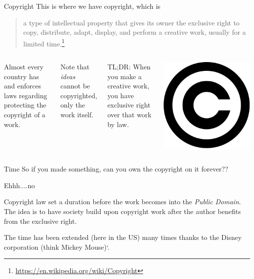 \begin{frame}{Copyright}
  This is where we have copyright, which is
  \begin{quote}
  a type of intellectual property that gives its owner the exclusive right to copy, distribute, adapt, display, and perform a creative work, usually for a limited time.\footnote{\url{https://en.wikipedia.org/wiki/Copyright}}
  \end{quote}
  \begin{columns}[onlytextwidth,T]
  Almost every country has and enforces laws regarding protecting the copyright of a work. \pause

  Note that \textit{ideas} cannot be copyrighted, only the work itself. \pause

  TL;DR: When you make a creative work, you have exclusive right over that work by law.

  \center \includegraphics[width=\textwidth]{eimg/copyrightSym.png}
  \end{columns}
\end{frame}

\begin{frame}{Time}
  So if you made something, can you own the copyright on it forever??\pause

  Ehhh....no\pause

  Copyright law set a duration before the work becomes into the \textit{Public Domain}. The idea is to have society build upon copyright work after the author benefits from the exclusive right.

  The time has been extended (here in the US) many times thanks to the Disney corporation (think Mickey Mouse)`.
\end{frame}

